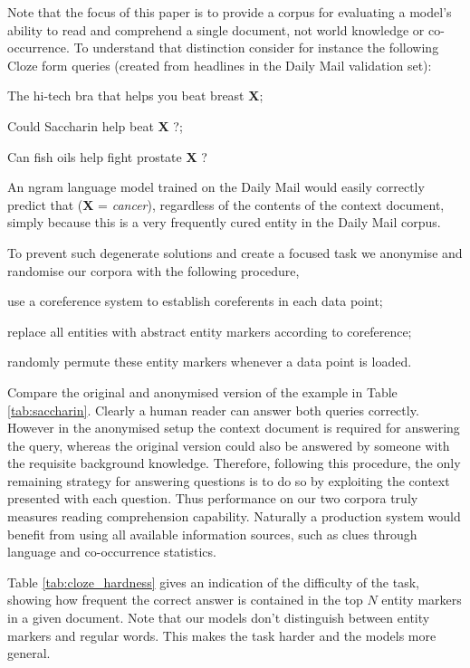 \documentclass{article}
\begin{document}
Note that the focus of this paper is to provide a corpus for evaluating a model's
ability to read and comprehend a single document, not world knowledge or
co-occurrence. To understand that distinction consider for instance the
following Cloze form queries (created from headlines in the Daily Mail
validation set):
\begin{inparaenum}
  \item The hi-tech bra that helps you beat breast \textbf{X};
  \item Could Saccharin help beat \textbf{X} ?;
  \item Can fish oils help fight prostate \textbf{X} ?
\end{inparaenum}
An ngram language model trained on the Daily Mail would easily correctly predict
that (\textbf{X} = \textit{cancer}), regardless of the contents of the context
document, simply because this is a very frequently cured entity in the Daily Mail
corpus.

To prevent such degenerate solutions and create a focused task we anonymise and
randomise our corpora with the following procedure,
\begin{inparaenum}
  \item use a coreference system to establish coreferents in each
    data point;
  \item replace all entities with abstract entity markers according to
    coreference;
  \item randomly permute these entity markers whenever a data point is loaded.
\end{inparaenum}

Compare the original and anonymised version of the example in Table
\ref{tab:saccharin}. Clearly a human reader can answer both queries correctly.
However in the anonymised setup the context document is required for answering
the query, whereas the original version could also be answered by someone with
the requisite background knowledge.
Therefore, following this procedure, the only remaining strategy for answering
questions is to do so by exploiting the context presented with each question.
Thus performance on our two corpora truly measures reading comprehension
capability.  Naturally a production system would benefit from using all
available information sources, such as clues through language and co-occurrence
statistics.

Table \ref{tab:cloze_hardness} gives an indication of the difficulty of the
task, showing how frequent the correct answer is contained in the top $N$ entity
markers in a given document. Note that our models don't distinguish between
entity markers and regular words. This makes the task harder and the models more
general.
\end{document}
